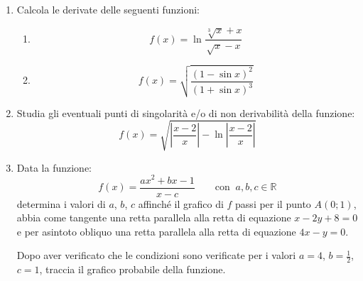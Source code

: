              \begin{enumerate}
                          
                           \item Calcola le derivate delle seguenti funzioni:
                           \begin{enumerate}
                                        \item \begin{equation*}
                                                      f\left(x\right)=\ln \frac{\sqrt[3]{x}+x}{\sqrt{x}-x}
                                        \end{equation*}
                                        \item \begin{equation*}
                                                     f\left(x\right)=\sqrt{\frac{\left(1-\sin x \right)^2}{\left(1 + \sin x \right)^3}}
                                        \end{equation*}
                           \end{enumerate}          
                          
                           \item Studia gli eventuali punti di singolarità e/o di non derivabilità della funzione:
                                        \begin{equation*}
                                                     f\left(x\right)=\sqrt{\left|\frac{x-2}{x}\right|-\ln \left|\frac{x-2}{x}\right|}
                                        \end{equation*}
                          
                           \item Data la funzione:
                                        \begin{equation*}
                                                     f\left(x\right)=\frac{ax^2+bx-1}{x-c}\qquad \mbox{con}\;\;a,b,c \in \mathbb{R}
                                        \end{equation*}
                           determina i valori di $a$, $b$, $c$ affinché il grafico di $f$ passi per il punto $A\left(0; 1\right)$, abbia come tangente una retta parallela alla retta di equazione $x-2y+8=0$ e per asintoto obliquo una retta parallela alla retta di equazione $4x-y=0$.
                          
                           Dopo aver verificato che le condizioni sono verificate per i valori $a=4$, $b=\frac{1}{2}$, $c=1$, traccia il grafico probabile della funzione.
                          
             \end{enumerate}
            
